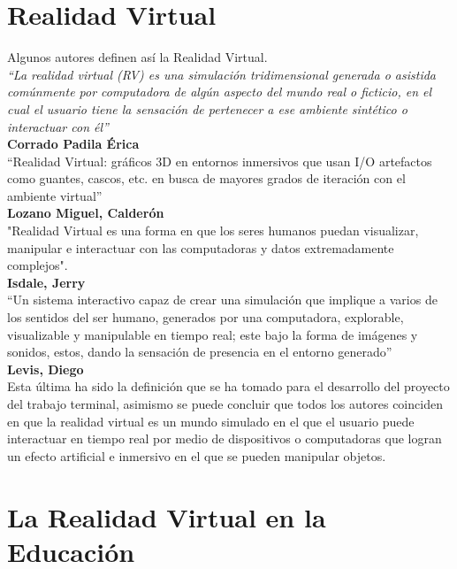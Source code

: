 \section{Realidad Virtual}
Algunos autores definen así la Realidad Virtual.\\
\newline
\textit{“La realidad virtual (RV) es una simulación tridimensional generada o asistida comúnmente por computadora de algún aspecto del mundo real o ficticio, en el cual 
el usuario tiene la sensación de pertenecer a ese ambiente sintético o interactuar con él”}\cite{web6}\\ 
\textbf{Corrado Padila Érica}\\
\newline
“Realidad Virtual: gráficos 3D en entornos inmersivos que usan I/O
artefactos como guantes, cascos, etc. en busca de mayores grados de iteración
con el ambiente virtual”\cite{web7}\\ 
\textbf{Lozano Miguel, Calderón}\\
\newline
"Realidad Virtual es una forma en que los seres humanos puedan
visualizar, manipular e interactuar con las computadoras y datos extremadamente
complejos".\cite{web8}\\
\textbf{Isdale, Jerry}\\
\newline
“Un sistema interactivo capaz de crear una simulación que implique a varios de los sentidos del ser humano, generados por una computadora, explorable, visualizable y manipulable 
en tiempo real; este bajo la forma de imágenes y sonidos, estos, dando la sensación de presencia en el entorno generado”\cite{web9}\\
\textbf{Levis, Diego}\\
\newline
Esta última ha sido la definición que se ha tomado para el desarrollo del proyecto del trabajo terminal, asimismo se puede concluir que todos los autores coinciden en que la 
realidad virtual es un mundo simulado en el que el usuario puede interactuar en tiempo real por medio
de dispositivos o computadoras que logran un efecto artificial e inmersivo en el que se pueden manipular objetos.

\section{La Realidad Virtual en la Educaci\'on}

